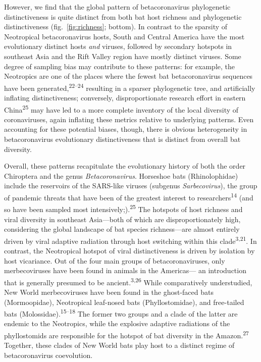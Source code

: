\documentclass[10pt,oneside]{article}
\begin{document}
However, we find that the global pattern of betacoronavirus phylogenetic
distinctiveness is quite distinct from both bat host richness and
phylogenetic distinctiveness (fig.~\ref{fig:richness}; bottom). In
contrast to the sparsity of Neotropical betacoronavirus hosts, South and
Central America have the most evolutionary distinct hosts \emph{and}
viruses, followed by secondary hotspots in southeast Asia and the Rift
Valley region have mostly distinct viruses. Some degree of sampling bias
may contribute to these patterns: for example, the Neotropics are one of
the places where the fewest bat betacoronavirus sequences have been
generated,\textsuperscript{22--24} resulting in a sparser phylogenetic
tree, and artificially inflating distinctiveness; conversely,
disproportionate research effort in eastern China\textsuperscript{25}
may have led to a more complete inventory of the local diversity of
coronaviruses, again inflating these metrics relative to underlying
patterns. Even accounting for these potential biases, though, there is
obvious heterogeneity in betacoronavirus evolutionary distinctiveness
that is distinct from overall bat diversity.

Overall, these patterns recapitulate the evolutionary history of both
the order Chiroptera and the genus \emph{Betacoronavirus}. Horseshoe
bats (Rhinolophidae) include the reservoirs of the SARS-like viruses
(subgenus \emph{Sarbecovirus}), the group of pandemic threats that have
been of the greatest interest to researchers\textsuperscript{14} (and so
have been sampled most intensively;).\textsuperscript{25} The hotspots
of host richness and viral diversity in southeast Asia---both of which
are disproportionately high, considering the global landscape of bat
species richness---are almost entirely driven by viral adaptive
radiation through host switching within this
clade\textsuperscript{3,21}. In contrast, the Neotropical hotspot of
viral distinctiveness is driven by isolation by host vicariance. Out of
the four main groups of betacoronaviruses, only merbecoviruses have been
found in animals in the Americas--- an introduction that is generally
presumed to be ancient.\textsuperscript{3,26} While comparatively
understudied, New World merbecoviruses have been found in the
ghost-faced bats (Mormoopidae), Neotropical leaf-nosed bats
(Phyllostomidae), and free-tailed bats
(Molossidae).\textsuperscript{15--18} The former two groups and a clade
of the latter are endemic to the Neotropics, while the explosive
adaptive radiations of the phyllostomids are responsible for the hotspot
of bat diversity in the Amazon.\textsuperscript{27} Together, these
clades of New World bats play host to a distinct regime of
betacoronavirus coevolution.
\end{document}
